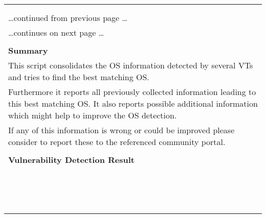\documentclass{article}
\begin{document}
\begin{longtable}{|p{}|}
\hline
\rowcolor{gvm_log}{\color{white}{Log (CVSS: 0.0) }}\\
\rowcolor{gvm_log}{\color{white}{NVT: OS Detection Consolidation and Reporting}}\\
\hline
\endfirsthead
\hfill\ldots continued from previous page \ldots \\
\hline
\endhead
\hline
\ldots continues on next page \ldots \\
\endfoot
\hline
\endlastfoot
\\
\textbf{Summary}\\
This script consolidates the OS information detected by several
  VTs and tries to find the best matching OS.\\
  Furthermore it reports all previously collected information leading to this best matching OS. It
  also reports possible additional information which might help to improve the OS detection.\\
  If any of this information is wrong or could be improved please consider to report these to the
  referenced community portal.\\

        \hline
        \\
\textbf{Vulnerability Detection Result}\\
\rowcolor{white}{\verb=Best matching OS:=}\\
\rowcolor{white}{\verb=OS:           Ubuntu 20.04=}\\
\rowcolor{white}{\verb=Version:      20.04=}\\
\rowcolor{white}{\verb=CPE:          cpe:/o:canonical:ubuntu_linux:20.04=}\\
\rowcolor{white}{\verb=Found by NVT: 1.3.6.1.4.1.25623.1.0.105586 (Operating System (OS) Detection (SSH=}\\
\rowcolor{white}{$\hookrightarrow$\verb=))=}\\
\rowcolor{white}{\verb=Concluded from SSH banner on port 22/tcp: SSH-2.0-OpenSSH_8.2p1 Ubuntu-4ubuntu0.=}\\
\rowcolor{white}{$\hookrightarrow$\verb=5=}\\
\rowcolor{white}{\verb=Setting key "Host/runs_unixoide" based on this information=}\\
\rowcolor{white}{\verb=Other OS detections (in order of reliability):=}\\
\rowcolor{white}{\verb=OS:           Linux/Unix=}\\
\rowcolor{white}{\verb=CPE:          cpe:/o:linux:kernel=}\\
\rowcolor{white}{\verb=Found by NVT: 1.3.6.1.4.1.25623.1.0.111067 (Operating System (OS) Detection (HTT=}\\
\rowcolor{white}{$\hookrightarrow$\verb=P))=}\\
\rowcolor{white}{\verb=Concluded from HTTP Server banner on port 631/tcp: Server: CUPS/2.3 IPP/2.1=}\\


\end{longtable}
\end{document}

